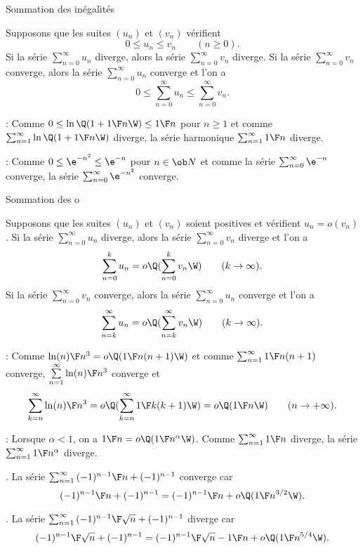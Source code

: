 \Concept Sommation des inégalités

Supposons que les suites $(u_n)$ et $(v_n)$ vérifient 
$$
0\le u_n\le v_n\qquad(n\ge0).
$$ 
Si la série $\sum_{n=0}^\infty u_n$ diverge, alors la série $\sum_{n=0}^\infty v_n$ diverge. \pn
Si la série $\sum_{n=0}^\infty v_n$ converge, alors la série $\sum_{n=0}^\infty u_n$ converge et l'on a 
$$
0\le \sum_{n=0}^\infty u_n\le\sum_{n=0}^\infty v_n. 
$$ 

\Application : Comme $0\le \ln\Q(1+{1\F n}\W)\le {1\F n}$ pour $n\ge1$ 
et comme $\sum_{n=1}^\infty\ln\Q(1+{1\F n}\W)$ diverge, la série harmonique 
$\sum_{n=1}^\infty{1\F n}$ diverge. 
\bigskip


\Application : Comme $0\le \e^{-n^2}\le \e^{-n}$ pour $n\in\ob N$ et comme la série $\sum_{n=0}^\infty\e^{-n}$ converge, 
la série $\sum_{n=0}^\infty\e^{-n^2}$ converge. 
\bigskip

\Concept Sommation des o

Supposons que les suites $(u_n)$ et $(v_n)$ soient positives et vérifient $u_n=o(v_n)$. \pn 
Si la série $\sum_{n=0}^\infty u_n$ diverge, alors la série $\sum_{n=0}^\infty v_n$ diverge et l'on a 
$$
\sum\limits_{n=0}^ku_n=o\Q(\sum\limits_{n=0}^kv_n\W)\qquad(k\to\infty). 
$$
Si la série $\sum_{n=0}^\infty v_n$ converge, alors la série $\sum_{n=0}^\infty u_n$ converge 
et l'on a 
$$
\sum\limits_{n=k}^\infty u_n=o\Q(\sum\limits_{n=k}^\infty v_n\W)\qquad(k\to\infty). 
$$ 

\Application : Comme ${\ln(n)\F n^3}=o\Q({1\F n(n+1)}\W)$ et comme $\sum_{n=1}^\infty{1\F n(n+1)}$ converge, 
$\sum\limits_{n=1}^\infty{\ln(n)\F n^3}$ converge et 
$$
\sum\limits_{k=n}^\infty{\ln(n)\F n^3}=o\Q(\sum\limits_{k=n}^\infty{1\F k(k+1)}\W)=o\Q({1\F n}\W)\qquad (n\to+\infty).
$$


\Application : Lorsque $\alpha<1$, on a ${1\F n}=o\Q({1\F n^\alpha}\W)$. Comme $\sum_{n=1}^\infty{1\F n}$ diverge, 
la série $\sum_{n=1}^\infty{1\F n^\alpha}$ diverge. 
\bigskip


\Exemple. La série $\sum_{n=1}^\infty{(-1)^{n-1}\F n+(-1)^{n-1}}$ converge car 
$$
{(-1)^{n-1}\F n+(-1)^{n-1}}={(-1)^{n-1}\F n}+o\Q(1\F n^{3/2}\W). 
$$

\Exemple. La série $\sum_{n=1}^\infty{(-1)^{n-1}\F\sqrt n+(-1)^{n-1}}$ diverge car 
$$
{(-1)^{n-1}\F\sqrt n+(-1)^{n-1}}={(-1)^{n-1}\F\sqrt n}-{1\F n}+o\Q({1\F n^{5/4}}\W). 
$$


